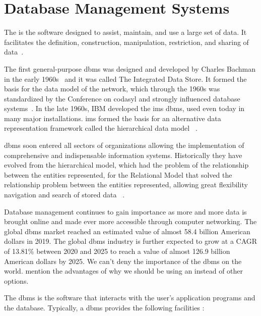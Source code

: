 \section{Database Management Systems}
\label{sc:DBMS}


The  is the software designed to assist, maintain, and use a large set of data. It facilitates the definition, construction, manipulation, restriction, and sharing of data~\cite{gehrke_2002}. 

The first general-purpose \gls{dbms} was designed and developed by Charles Bachman in the early 1960s~\cite{haigh2016charles} and it was called The Integrated Data Store. It formed the basis for the data model of the network, which through the 1960s was standardized by the Conference on \gls{codasyl} and strongly influenced database systems~\cite{gehrke_2002,haigh2016charles}.
In the late 1960s, IBM developed the \gls{ims} \gls{dbms}, used even today in many major installations. \gls{ims} formed the basis for an alternative data representation framework called the hierarchical data model ~\cite{gehrke_2002}. 

\gls{dbms} soon entered all sectors of organizations allowing the implementation of comprehensive and indispensable information systems. Historically they have evolved from the hierarchical model, which had the problem of the relationship between the entities represented, for the Relational Model that solved the relationship problem between the entities represented, allowing great flexibility navigation and search of stored data ~\cite{gehrke_2002}.

Database management continues to gain importance as more and more data is
brought online and made ever more accessible through computer networking. The global \gls{dbms} market reached an estimated value of almost 58.4 billion American dollars in 2019. The global \gls{dbms} industry is further expected to grow at a CAGR of 13.81\% between 2020 and 2025 to reach a value of almost 126.9 billion American dollars by 2025. We can't deny the importance of the \gls{dbms} on the world. mention the advantages of why we should be using an instead of other options.

The \gls{dbms} is the software that interacts with the user's application programs and the database. Typically, a \gls{dbms} provides the following facilities \cite{begg}:

